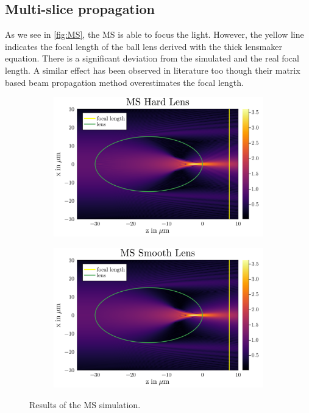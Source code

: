 \documentclass[a4paper,12pt]{article}
\begin{document}
\subsection{Multi-slice propagation}
As we see in \autoref{fig:MS}, the MS is able to focus the light. However, the yellow line indicates the focal length of the ball lens derived with the thick lensmaker equation. There is a significant deviation from the simulated and the real focal length. A similar effect has been observed in literature too \cite{schmidt2016wave} though their matrix based beam propagation method overestimates the focal length.
\begin{figure}[H]
    \centering
    \begin{subfigure}[]{0.5\textwidth}
        \centering
        \includegraphics[width=\textwidth]{../figures/MS_hard.svg.png} 
    \end{subfigure}%
    \begin{subfigure}[]{0.5\textwidth}
        \centering
        \includegraphics[width=\textwidth]{../figures/MS_soft.svg.png} 
    \end{subfigure}
    \caption{Results of the MS simulation.}
    \label{fig:MS}
\end{figure}
\end{document}
